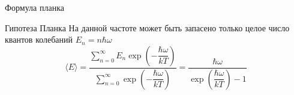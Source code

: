 \documentclass[12]{beamer}
\begin{document}
\begin{frame}[t]{Формула планка}\scriptsize
\begin{block}{Гипотеза Планка}
На данной частоте может быть запасено только целое число квантов колебаний $E_n =n \hbar \omega$
$$\langle E \rangle = \dfrac{\sum\limits_{n=0}^{\infty} E_n \exp{\left(-\dfrac{\hbar \omega}{kT}\right)}}{\sum\limits_{n=0}^{\infty} \exp{\left(-\dfrac{\hbar \omega}{kT}\right)}} = \dfrac{\hbar \omega}{\exp{\left(\dfrac{\hbar \omega}{kT}\right)} - 1}$$
\end{block}
\end{frame}
\end{document}
